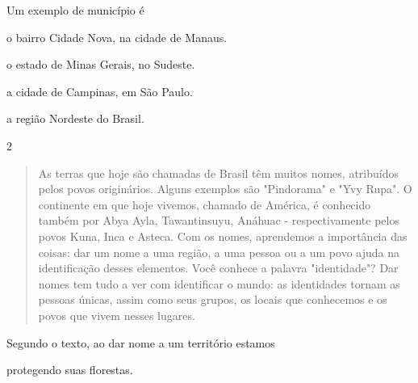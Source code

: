 \begin{itemize}
\begin{itemize}
\begin{itemize}
\begin{itemize}
{{\begin{quote}
\end{quote}

Um exemplo de município é

\begin{escolha}
\item o bairro Cidade Nova, na cidade de Manaus.

\item o estado de Minas Gerais, no Sudeste.

\item a cidade de Campinas, em São Paulo.

\item a região Nordeste do Brasil.
\end{escolha}


\num{2}

\begin{quote}
As terras que hoje são chamadas de Brasil têm muitos nomes, atribuídos pelos
povos originários. Alguns exemplos são "Pindorama" e "Yvy Rupa". O continente em que hoje
vivemos, chamado de América, é conhecido também por Abya Ayla, Tawantinsuyu, Anáhuac - respectivamente pelos
povos Kuna, Inca e Asteca. Com os nomes, aprendemos a importância das
coisas: dar um nome a uma região, a uma pessoa ou a um povo ajuda na identificação desses elementos. Você conhece a palavra "identidade"?
Dar nomes tem tudo a ver com identificar o mundo: as
identidades tornam as pessoas únicas, assim como seus grupos, os locais que conhecemos e os povos que vivem nesses lugares.

\end{quote}

Segundo o texto, ao dar nome a um território estamos

\begin{escolha}
\item protegendo suas florestas.


\end{escolha}}}
\end{itemize}
\end{itemize}
\end{itemize}
\end{itemize}
